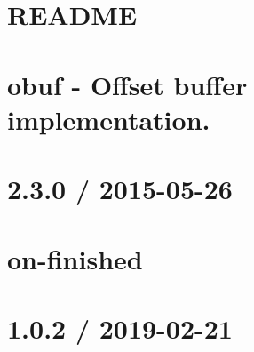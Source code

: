 \documentclass[twoside]{book}
\newcommand{\+}{\discretionary{\mbox{\scriptsize$\hookleftarrow$}}{}{}}
\begin{document}
\chapter{README}
\label{md__c___users_vaishnavi_jadhav__desktop__developer_code_mean_stack_example_client_node_modules_object_assign__r_e_a_d_m_e}

\chapter{obuf -\/ Offset buffer implementation.}
\label{md__c___users_vaishnavi_jadhav__desktop__developer_code_mean_stack_example_client_node_modules_obuf__r_e_a_d_m_e}

\chapter{2.3.0 / 2015-\/05-\/26}
\label{md__c___users_vaishnavi_jadhav__desktop__developer_code_mean_stack_example_client_node_modules_on_finished__h_i_s_t_o_r_y}

\chapter{on-\/finished}
\label{md__c___users_vaishnavi_jadhav__desktop__developer_code_mean_stack_example_client_node_modules_on_finished__r_e_a_d_m_e}

\chapter{1.0.2 / 2019-\/02-\/21}
\label{md__c___users_vaishnavi_jadhav__desktop__developer_code_mean_stack_example_client_node_modules_on_headers__h_i_s_t_o_r_y}

\end{document}
